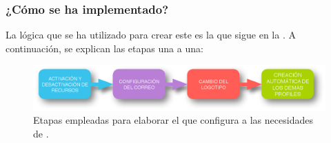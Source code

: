 \subsubsection{¿Cómo se ha implementado?}

La lógica que se ha utilizado para crear este \profile{} es la que sigue en la . A continuación, se explican las etapas una a una:

\begin{figure}
\centering
\includegraphics[width=\linewidth]{../graphics/fig_configuracion_alma_profile.eps}
\caption{Etapas empleadas para elaborar el \profile{} que configura \tiki{} a las necesidades de \alma{}.}\label{fig:configuracion_alma_profile}
\end{figure}


